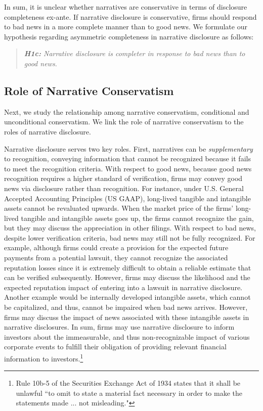 \documentclass[letterpaper,12pt]{article}
\begin{document}
\begin{spacing}{1.5}
In sum, it is unclear whether narratives are conservative in terms of disclosure completeness ex-ante. If narrative disclosure is conservative, firms should respond to bad news in a more complete manner than to good news. We formulate our hypothesis regarding asymmetric completeness in narrative disclosure as follows:

\begin{quote}\label{hyp:h1c}
\textit{\textbf{H1c:} Narrative disclosure is completer in response to bad news than to good news.}
\end{quote}

\subsection{Role of Narrative Conservatism}\label{sec2.2}
\noindent Next, we study the relationship among narrative conservatism, conditional and unconditional conservatism. We link the role of narrative conservatism to the roles of narrative disclosure.

Narrative disclosure serves two key roles. First, narratives can be \textit{supplementary} to recognition, conveying information that cannot be recognized because it fails to meet the recognition criteria. With respect to good news, because good news recognition requires a higher standard of verification, firms may convey good news via disclosure rather than recognition. For instance, under U.S. General Accepted Accounting Principles (US GAAP), long-lived tangible and intangible assets cannot be revaluated upwards. When the market price of the firms' long-lived tangible and intangible assets goes up, the firms cannot recognize the gain, but they may discuss the appreciation in other filings. With respect to bad news, despite lower verification criteria, bad news may still not be fully recognized. For example, although firms could create a provision for the expected future payments from a potential lawsuit, they cannot recognize the associated reputation losses since it is extremely difficult to obtain a reliable estimate that can be verified subsequently. However, firms may discuss the likelihood and the expected reputation impact of entering into a lawsuit in narrative disclosure. Another example would be internally developed intangible assets, which cannot be capitalized, and thus, cannot be impaired when bad news arrives. However, firms may discuss the impact of news associated with these intangible assets in narrative disclosures. In sum, firms may use narrative disclosure to inform investors about the immeasurable, and thus non-recognizable impact of various corporate events to fulfill their obligation of providing relevant financial information to investors.\footnote{Rule 10b-5 of the Securities Exchange Act of 1934 states that it shall be unlawful ``to omit to state a material fact necessary in order to make the statements made ... not misleading."}


\end{spacing}
\end{document}
